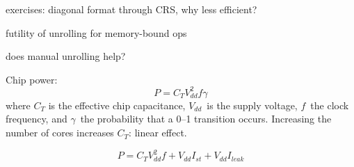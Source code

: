 exercises:
diagonal format through CRS, why less efficient?

futility of unrolling for memory-bound ops

does manual unrolling help?

Chip power:
\[ P=C_TV_{dd}^2f\gamma \]
where $C_T$ is the effective chip capacitance, $V_{dd}$~is the supply
voltage, $f$~the clock frequency, and $\gamma$~the probability that a
0--1 transition occurs.
Increasing the number of cores increases $C_T$: linear effect.

\[ P=C_TV_{dd}^2f+V_{dd}I_{st}+V_{dd}I_{leak} \]
